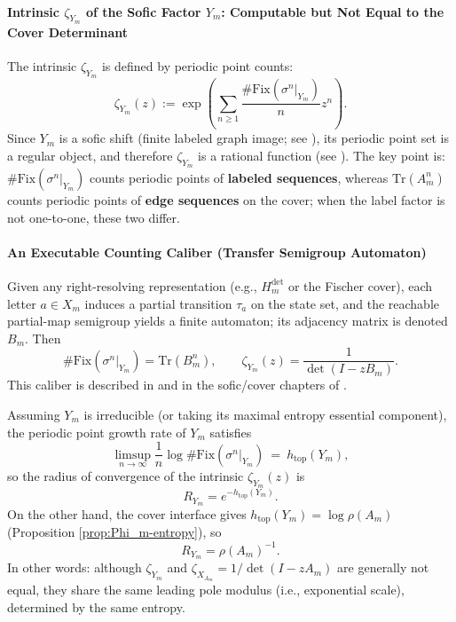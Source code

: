 \paragraph{Intrinsic \texorpdfstring{$\zeta_{Y_m}$}{zetaYm} of the Sofic Factor \texorpdfstring{$Y_m$}{Ym}: Computable but Not Equal to the Cover Determinant}
The intrinsic \(\zeta_{Y_m}\) is defined by periodic point counts:
\[
\zeta_{Y_m}(z):=\exp\left(\sum_{n\ge 1}\frac{\#\mathrm{Fix}(\sigma^n|_{Y_m})}{n}z^n\right).
\]
Since \(Y_m\) is a sofic shift (finite labeled graph image; see \cite{Weiss1973SFTandSofic,CovenPaul1975SoficSystems,LindMarcus1995,Kitchens1998SymbolicDynamics}), its periodic point set is a regular object, and therefore \(\zeta_{Y_m}\) is a rational function (see \cite{Manning1971RationalZeta}). The key point is: \(\#\mathrm{Fix}(\sigma^n|_{Y_m})\) counts periodic points of \textbf{labeled sequences}, whereas \(\mathrm{Tr}(A_m^n)\) counts periodic points of \textbf{edge sequences} on the cover; when the label factor is not one-to-one, these two differ.

\paragraph{An Executable Counting Caliber (Transfer Semigroup Automaton)}
Given any right-resolving representation (e.g., $H_m^{\mathrm{det}}$ or the Fischer cover), each letter $a\in X_m$ induces a partial transition $\tau_a$ on the state set, and the reachable partial-map semigroup yields a finite automaton; its adjacency matrix is denoted $B_m$. Then
\[
\#\mathrm{Fix}(\sigma^n|_{Y_m})=\mathrm{Tr}(B_m^n),\qquad
\zeta_{Y_m}(z)=\frac{1}{\det(I-zB_m)}.
\]
This caliber is described in \cite{Nasu1995TextileSystems} and in the sofic/cover chapters of \cite{LindMarcus1995,Kitchens1998SymbolicDynamics}.

\begin{proposition}\label{prop:Ym-zeta-leading-pole}
Assuming \(Y_m\) is irreducible (or taking its maximal entropy essential component), the periodic point growth rate of \(Y_m\) satisfies
\[
\limsup_{n\to\infty}\frac{1}{n}\log\#\mathrm{Fix}(\sigma^n|_{Y_m})
\ =\ h_{\mathrm{top}}(Y_m),
\]
so the radius of convergence of the intrinsic \(\zeta_{Y_m}(z)\) is
\[
R_{Y_m}=e^{-h_{\mathrm{top}}(Y_m)}.
\]
On the other hand, the cover interface gives \(h_{\mathrm{top}}(Y_m)=\log\rho(A_m)\) (Proposition \ref{prop:Phi_m-entropy}), so
\[
R_{Y_m}=\rho(A_m)^{-1}.
\]
In other words: although \(\zeta_{Y_m}\) and \(\zeta_{X_{A_m}}=1/\det(I-zA_m)\) are generally not equal, they share the same leading pole modulus (i.e., exponential scale), determined by the same entropy.
\end{proposition}

